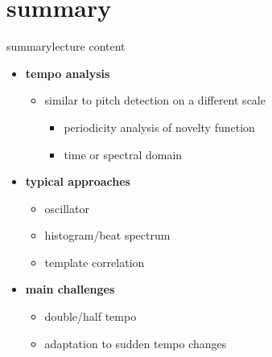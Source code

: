     \section{summary}
        \begin{frame}{summary}{lecture content}
            \begin{itemize}
                \item   \textbf{tempo analysis}
                    \begin{itemize}
                        \item   similar to pitch detection on a different scale
                            \begin{itemize}
                                \item   periodicity analysis of novelty function
                                \item   time or spectral domain
                            \end{itemize}
                    \end{itemize}
                \bigskip
                \item   \textbf{typical approaches}
                    \begin{itemize}
                        \item   oscillator
                        \item   histogram/beat spectrum
                        \item   template correlation
                    \end{itemize}
                \bigskip
                \item   \textbf{main challenges}
                    \begin{itemize}
                        \item   double/half tempo
                        \item   adaptation to sudden tempo changes
                    \end{itemize}
            \end{itemize}
        \end{frame}

